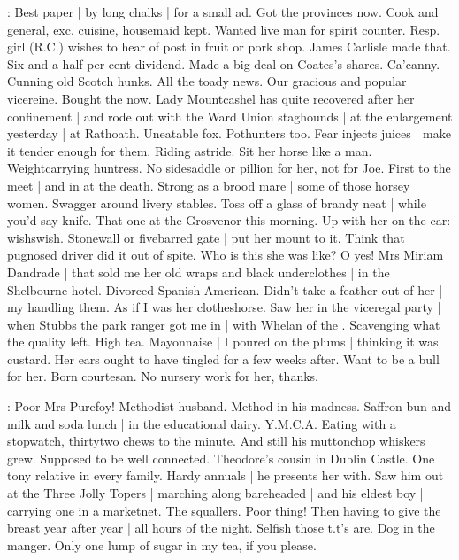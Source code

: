 \BloomInt:
Best paper |
by long chalks |
for a small ad.
Got the provinces now.
Cook and general,
exc.\@ \stage{[excellent]} cuisine,
housemaid kept.
Wanted live man for spirit counter.
Resp.\@ \stage{[respectable]} girl (R.C.\@ {})
wishes to hear of post in fruit or pork shop.
James Carlisle made that.
Six and a half per cent dividend.
Made a big deal on Coates's shares.
Ca'canny.
Cunning old Scotch hunks.
All the toady news.
Our gracious and popular vicereine.
Bought the  now.
Lady Mountcashel has quite recovered after her confinement |
and rode out with the Ward Union staghounds |
at the enlargement yesterday |
at Rathoath.
Uneatable fox.
Pothunters too.
Fear injects juices |
make it tender enough for them.
Riding astride.
Sit her horse like a man.
Weight\-carrying huntress.
No sidesaddle or pillion for her,
not for Joe.
First to the meet |
and in at the death.
Strong as a brood mare |
some of those horsey women.
Swagger around livery stables.
Toss off a glass of brandy neat |
while you'd say knife.
That one at the Grosvenor this morning.
Up with her on the car:
wish\-swish.
Stonewall or fivebarred gate |
put her mount to it.
Think that pugnosed driver did it out of spite.
Who is this she was like?
O yes!
Mrs Miriam Dandrade |
that sold me
her old wraps and black underclothes |
in the Shelbourne hotel.
Divorced Spanish American.
Didn't take a feather out of her |
my handling them.
As if I was her clotheshorse.
Saw her in the viceregal party |
when Stubbs the park ranger got me in |
with Whelan of the .
Scavenging what the quality left.
High tea.
Mayonnaise |
I poured on the plums |
thinking it was custard.
Her ears ought to have tingled for a few weeks after.
Want to be a bull for her.
Born courtesan.
No nursery work for her,
thanks.

\BloomInt:
Poor Mrs Purefoy!
Methodist husband.
Method in his madness.
Saffron bun and milk and soda lunch |
in the educational dairy.
Y.M.C.A\@.
Eating with a stopwatch,
thirtytwo chews to the minute.
And still his muttonchop whiskers grew.
Supposed to be well connected.
Theodore's cousin in Dublin Castle.
One tony relative in every family.
Hardy annuals |
he presents her with.
Saw him out at the Three Jolly Topers |
marching along bareheaded |
and his eldest boy |
carrying one in a marketnet.
The squallers.
Poor thing!
Then having to give the breast year after year |
all hours of the night.
Selfish those t.t's are.
Dog in the manger.
Only one lump of sugar in my tea,
if you please.

